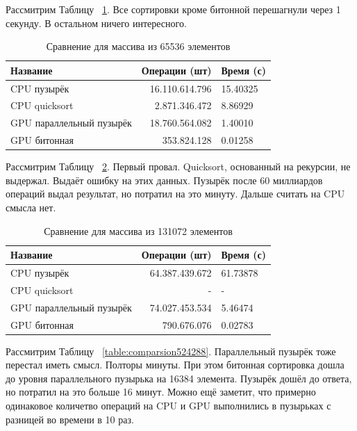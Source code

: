 \documentclass[a4paper,article]{article}
\begin{document}
    Рассмитрим Таблицу ~\ref{table:comparsion65536}. Все сортировки кроме битонной перешагнули через 1 секунду. В остальном ничего интересного.

    \begin{table}[h!]
        \centering
        \begin{tabular}{| l | r | l |}
            \hline
            {Название} & Операции (шт) & Время (с) \\
            \hline
            CPU пузырёк & 16.110.614.796 & 15.40325 \\
            \hline
            CPU quicksort & 2.871.346.472 & 8.86929 \\
            \hline
            GPU параллельный пузырёк & 18.760.564.082 & 1.40010 \\
            \hline
            GPU битонная & 353.824.128 & 0.01258 \\
            \hline
        \end{tabular}
        \caption{Сравнение для массива из 65536 элементов}
        \label{table:comparsion65536}
    \end{table}

    Рассмитрим Таблицу ~\ref{table:comparsion131072}. Первый провал. Quicksort, основанный на рекурсии, не выдержал. Выдаёт ошибку на этих данных. Пузырёк после 60 миллиардов операций выдал результат, но потратил на это минуту. Дальше считать на CPU смысла нет.

    \begin{table}[h!]
        \centering
        \begin{tabular}{| l | r | l |}
            \hline
            {Название} & Операции (шт) & Время (с) \\
            \hline
            CPU пузырёк & 64.387.439.672 & 61.73878 \\
            \hline
            CPU quicksort & - & - \\
            \hline
            GPU параллельный пузырёк & 74.027.453.534 & 5.46474 \\
            \hline
            GPU битонная & 790.676.076 & 0.02783 \\
            \hline
        \end{tabular}
        \caption{Сравнение для массива из 131072 элементов}
        \label{table:comparsion131072}
    \end{table}

    Рассмитрим Таблицу ~\ref{table:comparsion524288}. Параллельный пузырёк тоже перестал иметь смысл. Полторы минуты. При этом битонная сортировка дошла до уровня параллельного пузырька на 16384 элемента. Пузырёк дошёл до ответа, но потратил на это больше 16 минут. Можно ещё заметит, что примерно одинаковое количетво операций на CPU и GPU выполнились в пузырьках с разницей во времени в 10 раз.
\end{document}
